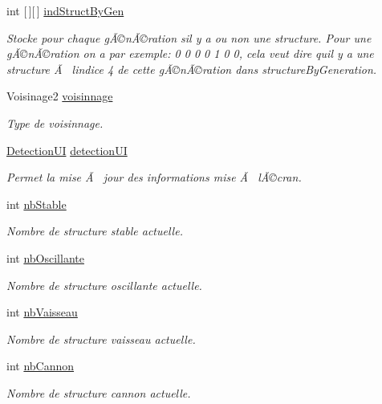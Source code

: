 \begin{DoxyCompactItemize}
int \mbox{[}$\,$\mbox{]}\mbox{[}$\,$\mbox{]} \mbox{\hyperlink{class_detection_a7cffb153fd4b42ba87d6a099e31a424e}{ind\+Struct\+By\+Gen}}
\begin{DoxyCompactList}\small\item\em Stocke pour chaque gÃ©nÃ©ration s\textquotesingle{}il y a ou non une structure. Pour une gÃ©nÃ©ration on a par exemple\+: 0 0 0 0 1 0 0, cela veut dire qu\textquotesingle{}il y a une structure Ã  l\textquotesingle{}indice 4 de cette gÃ©nÃ©ration dans structure\+By\+Generation. \end{DoxyCompactList}\item 
Voisinage2 \mbox{\hyperlink{class_detection_a6f99794fd28f6f79dedfc541f8b78154}{voisinnage}}
\begin{DoxyCompactList}\small\item\em Type de voisinnage. \end{DoxyCompactList}\item 
\mbox{\hyperlink{class_detection_u_i}{Detection\+UI}} \mbox{\hyperlink{class_detection_a2cb88a432e8b2083f27a286a32daf936}{detection\+UI}}
\begin{DoxyCompactList}\small\item\em Permet la mise Ã  jour des informations mise Ã  l\textquotesingle{}Ã©cran. \end{DoxyCompactList}\item 
int \mbox{\hyperlink{class_detection_a4b49d7d01d7b807387f89bbc03dc66b4}{nb\+Stable}}
\begin{DoxyCompactList}\small\item\em Nombre de structure stable actuelle. \end{DoxyCompactList}\item 
int \mbox{\hyperlink{class_detection_a0e0f6dbe71d5d7a5103416b6c5455faa}{nb\+Oscillante}}
\begin{DoxyCompactList}\small\item\em Nombre de structure oscillante actuelle. \end{DoxyCompactList}\item 
int \mbox{\hyperlink{class_detection_a7371f2754fb19faeee7e7711a42b6092}{nb\+Vaisseau}}
\begin{DoxyCompactList}\small\item\em Nombre de structure vaisseau actuelle. \end{DoxyCompactList}\item 
int \mbox{\hyperlink{class_detection_aa7929b2a7e34d53f93ed02da7a3d1ec8}{nb\+Cannon}}
\begin{DoxyCompactList}\small\item\em Nombre de structure cannon actuelle. \end{DoxyCompactList}\item 

\end{DoxyCompactItemize}
